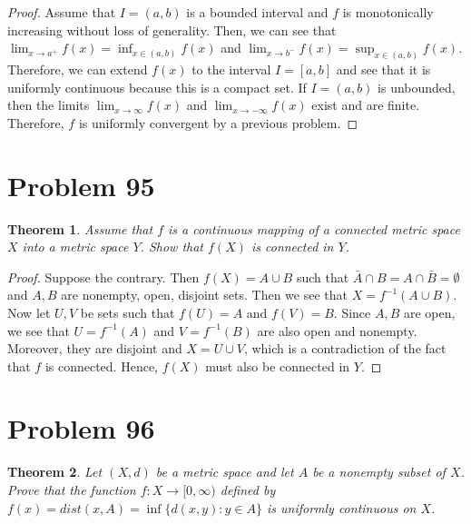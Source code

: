 \documentclass[psamsfonts]{amsart}
\newtheorem{thm}{Theorem}[section]
\theoremstyle{definition}
\theoremstyle{remark}
\numberwithin{equation}{section}
\begin{document}
\begin{proof}
Assume that $I = (a,b)$ is a bounded interval and $f$ is monotonically increasing without loss of generality. Then, we can see that $\lim_{x \to a^{+}} f(x) = \inf_{x \in (a,b)} f(x)$ and $\lim_{x \to b^{-}} f(x) = \sup_{x \in (a,b)} f(x)$. Therefore, we can extend $f(x)$ to the interval $I = [a,b]$ and see that it is uniformly continuous because this is a compact set. If $I = (a,b)$ is unbounded, then the limits $\lim_{x \to \infty} f(x)$ and $\lim_{x \to -\infty} f(x)$ exist and are finite. Therefore, $f$ is uniformly convergent by a previous problem. 
\end{proof}

\section{Problem 95}

\begin{thm}
Assume that $f$ is a continuous mapping of a connected metric space $X$ into a metric space $Y$. Show that $f(X)$ is connected in $Y$. 
\end{thm}

\begin{proof}
Suppose the contrary. Then $f(X) = A \cup B$ such that $ \bar{A} \cap B = A \cap \bar{B} = \emptyset$ and $A,B$ are nonempty, open, disjoint sets. Then we see that $X = f^{-1} (A \cup B)$. Now let $U,V$ be sets such that $f(U) = A$ and $f(V) = B$. Since $A,B$ are open, we see that $U = f^{-1}(A)$ and $V = f^{-1}(B)$ are also open and nonempty. Moreover, they are disjoint and $X = U \cup V$, which is a contradiction of the fact that $f$ is connected. Hence, $f(X)$ must also be connected in $Y$. 
\end{proof}

\section{Problem 96}

\begin{thm}
Let $(X,d)$ be a metric space and let $A$ be a nonempty subset of $X$. Prove that the function $f: X \to [0,\infty)$ defined by $f(x) = dist(x,A) = \inf \{ d(x,y): y \in A \}$ is uniformly continuous on $X$. 
\end{thm}
\end{document}
